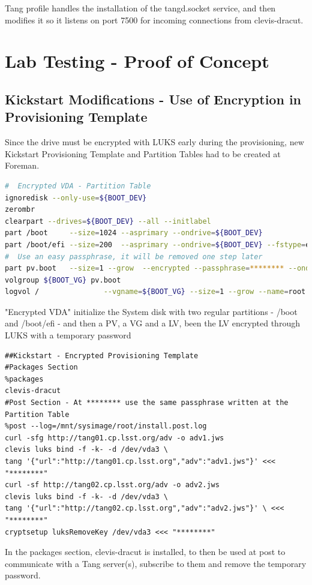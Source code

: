 Tang profile handles the installation of the tangd.socket service, and then modifies it so it listens on port 7500 for incoming connections from clevis-dracut.

\newpage
\section{Lab Testing - Proof of Concept}
\subsection{Kickstart Modifications - Use of Encryption in Provisioning Template}
Since the drive must be encrypted with LUKS early during the provisioning, new Kickstart Provisioning Template and Partition Tables had to be created at Foreman.

\vspace*{0.1mm}
\begin{lstlisting}[language=bash]
#  Encrypted VDA - Partition Table
ignoredisk --only-use=${BOOT_DEV}
zerombr
clearpart --drives=${BOOT_DEV} --all --initlabel
part /boot     --size=1024 --asprimary --ondrive=${BOOT_DEV}
part /boot/efi --size=200  --asprimary --ondrive=${BOOT_DEV} --fstype=efi
#  Use an easy passphrase, it will be removed one step later
part pv.boot   --size=1 --grow  --encrypted --passphrase=******** --ondisk=${BOOT_DEV}
volgroup ${BOOT_VG} pv.boot
logvol /               --vgname=${BOOT_VG} --size=1 --grow --name=root
\end{lstlisting}
\vspace*{0.1mm}
"Encrypted VDA" initialize the System disk with two regular partitions - /boot and /boot/efi - and then a PV, a VG and a LV, been the LV encrypted through LUKS with a temporary password
\vspace*{0.1mm}
\begin{lstlisting}
##Kickstart - Encrypted Provisioning Template
#Packages Section
%packages
clevis-dracut
#Post Section - At ******** use the same passphrase written at the Partition Table
%post --log=/mnt/sysimage/root/install.post.log
curl -sfg http://tang01.cp.lsst.org/adv -o adv1.jws
clevis luks bind -f -k- -d /dev/vda3 \
tang '{"url":"http://tang01.cp.lsst.org","adv":"adv1.jws"}' <<< "********"
curl -sf http://tang02.cp.lsst.org/adv -o adv2.jws
clevis luks bind -f -k- -d /dev/vda3 \
tang '{"url":"http://tang02.cp.lsst.org","adv":"adv2.jws"}' \ <<< "********"
cryptsetup luksRemoveKey /dev/vda3 <<< "********"
\end{lstlisting}
\vspace*{0.1mm}
In the packages section, clevis-dracut is installed, to then be used at post to communicate with a Tang server(s), subscribe to them and remove the temporary password.

